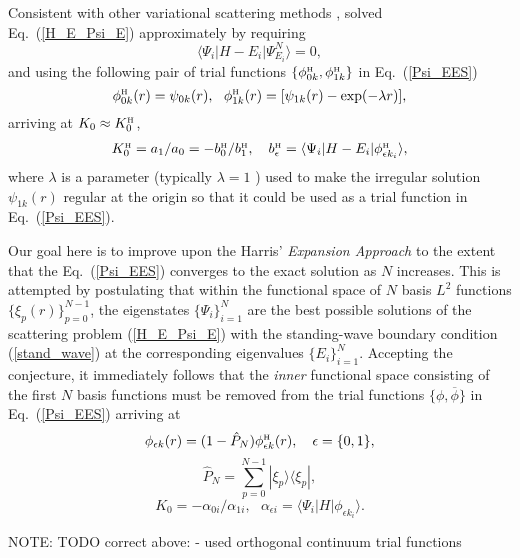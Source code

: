 \documentclass[aip
, pra
, showpacs
, aps
, twocolumn
, groupedaddress
, floatfix
]{revtex4}
\newcommand{\beq}{\begin{equation}}
\newcommand{\eeq}{\end{equation}}
\newcommand{\barr}{\begin{array}}
\newcommand{\earr}{\end{array}}
\newcommand{\phiH}{\phi^{\mbox{\tiny{H}}}}
\begin{document}
Consistent with other variational scattering methods \cite{Nesbet68},
\citet{Harris67} solved Eq.~(\ref{H_E_Psi_E}) approximately by requiring
\beq
\langle\Psi_i|H-E_i|\Psi^N_{E_i}\rangle=0,  \label{EES_ONE_C1}
\eeq
and using the following pair of trial functions $\{\phiH_{0k}, \phiH_{1k} \}$ in
Eq.~(\ref{Psi_EES})
\beq
\phiH_{0k}(r) =  \psi_{0k}(r),\ \
\phiH_{1k}(r) =  [\psi_{1k}(r) -  \exp(-\lambda r)],
\label{def_phi_H} \eeq
arriving at $K_0\approx K^{\mbox{\tiny{H}}}_{0}$,
\beq \barr{l}
K^{\mbox{\tiny{H}}}_{0} = a_1 / a_0 = - b^{\mbox{\tiny{H}}}_{0} / b^{\mbox{\tiny{H}}}_{1}, \ \ \
b^{\mbox{\tiny{H}}}_{\epsilon} = \langle\Psi_i|H-E_i|  \phiH_{\epsilon k_i} \rangle,
\earr \label{K_0_Harris} \eeq
where $\lambda$ is a parameter (typically $\lambda=1$ \cite{Nesbet68}) used to make the irregular solution $\psi_{1k}(r)$ regular
at the origin so that it could be used as a trial function in Eq.~(\ref{Psi_EES}).



Our goal here is to improve upon the Harris' {\em Expansion Approach} \cite{Harris67} to the extent that the Eq.~(\ref{Psi_EES})
converges to the exact solution as $N$ increases.
This is attempted by postulating that
within the functional space of $N$ basis $L^2$ functions  $\{\xi_p(r)\}_{p=0}^{N-1}$,
the eigenstates $\{\Psi_i\}_{i=1}^{N}$ are the best possible solutions of the scattering problem (\ref{H_E_Psi_E})
with the standing-wave boundary condition (\ref{stand_wave}) at the corresponding eigenvalues $\{E_i\}_{i=1}^{N}$.
Accepting the conjecture, it immediately follows that the {\em inner} functional space consisting of the first $N$ basis functions
must be removed from the trial functions $\{\phi,\overline{\phi}\}$ in Eq.~(\ref{Psi_EES}) arriving at
\beq
\phi_{\epsilon k}(r) = (1-\hat{P}_N) \phiH_{\epsilon k}(r),\ \ \ \epsilon = \{0,1\},
\label{def_phi} \eeq
\beq
\hat{P}_N = \sum_{p=0}^{N-1} | \xi_p \rangle \langle \xi_p |,
\label{P_N} \eeq
\beq
K_{0} = - \alpha_{0i} / \alpha_{1i}, \ \ \
\alpha_{\epsilon i} = \langle\Psi_i|H|  \phi_{\epsilon k_i} \rangle.
\label{K_0_EES} \eeq

NOTE: TODO correct above: \cite{HM69} - used orthogonal continuum trial functions
\end{document}
